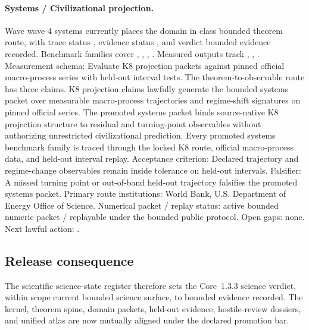 \paragraph{Systems / Civilizational projection.}
Wave wave 4 systems currently places the domain in class bounded theorem route, with trace status , evidence status , and verdict bounded evidence recorded.
Benchmark families cover , \allowbreak {}, \allowbreak {}, \allowbreak {}.
Measured outputs track , \allowbreak {}, \allowbreak {}.
Measurement schema: Evaluate K8 projection packets against pinned official macro-process series with held-out interval tests.
The theorem-to-observable route has three claims. K8 projection claims lawfully generate the bounded systems packet over measurable macro-process trajectories and regime-shift signatures on pinned official series. The promoted systems packet binds source-native K8 projection structure to residual and turning-point observables without authorizing unrestricted civilizational prediction. Every promoted systems benchmark family is traced through the locked K8 route, official macro-process data, and held-out interval replay.
Acceptance criterion: Declared trajectory and regime-change observables remain inside tolerance on held-out intervals.
Falsifier: A missed turning point or out-of-band held-out trajectory falsifies the promoted systems packet.
Primary route institutions: World Bank, \allowbreak U.S. Department of Energy Office of Science.
Numerical packet / replay status: active bounded numeric packet / replayable under the bounded public protocol.
Open gaps: none.
Next lawful action: .

\subsection{Release consequence}
The scientific science-state register therefore sets the Core~1.3.3 science verdict, within scope current bounded science surface, to bounded evidence recorded.
The kernel, theorem spine, domain packets, held-out evidence, hostile-review dossiers, and unified atlas are now mutually aligned under the declared promotion bar.
